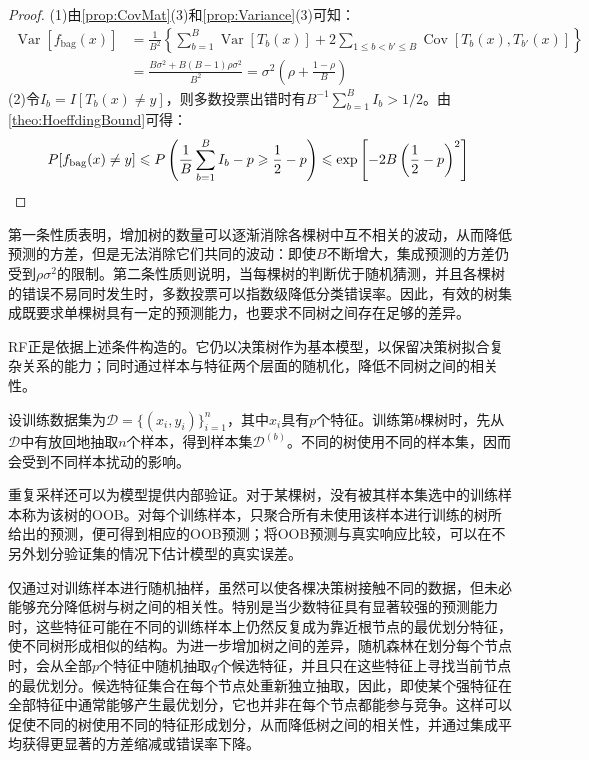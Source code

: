\begin{proof}
	(1)由\cref{prop:CovMat}(3)和\cref{prop:Variance}(3)可知：
	\begin{align*}
		\operatorname{Var}[f_{\mathrm{bag}}(x)]
		&=\frac{1}{B^2}\left\{\sum_{b=1}^{B}\operatorname{Var}[T_b(x)]+2\sum_{1\leqslant b<b'\leqslant B}\operatorname{Cov}[T_b(x),T_{b'}(x)]\right\} \\
		&=\frac{B\sigma^2+B(B-1)\rho\sigma^2}{B^2}
		=\sigma^2\left(\rho+\frac{1-\rho}{B}\right)
	\end{align*}
	(2)令$I_b=I[T_b(x)\ne y]$，则多数投票出错时有$B^{-1}\sum\limits_{b=1}^{B}I_b>1/2$。由\cref{theo:HoeffdingBound}可得：
	\begin{equation*}
		P[f_{\mathrm{bag}}(x)\ne y]
		\leqslant P\left(\frac{1}{B}\sum_{b=1}^{B}I_b-p\geqslant\frac{1}{2}-p\right)
		\leqslant\exp\left[-2B\left(\frac{1}{2}-p\right)^2\right]\qedhere
	\end{equation*}
\end{proof}
第一条性质表明，增加树的数量可以逐渐消除各棵树中互不相关的波动，从而降低预测的方差，但是无法消除它们共同的波动：即使$B$不断增大，集成预测的方差仍受到$\rho\sigma^2$的限制。第二条性质则说明，当每棵树的判断优于随机猜测，并且各棵树的错误不易同时发生时，多数投票可以指数级降低分类错误率。因此，有效的树集成既要求单棵树具有一定的预测能力，也要求不同树之间存在足够的差异。\par
\gls{RF}正是依据上述条件构造的。它仍以决策树作为基本模型，以保留决策树拟合复杂关系的能力；同时通过样本与特征两个层面的随机化，降低不同树之间的相关性。\par
设训练数据集为$\mathcal{D}=\{(x_i,y_i)\}_{i=1}^{n}$，其中$x_i$具有$p$个特征。训练第$b$棵树时，先从$\mathcal{D}$中有放回地抽取$n$个样本，得到样本集$\mathcal{D}^{(b)}$。不同的树使用不同的样本集，因而会受到不同样本扰动的影响。
\begin{note}
	重复采样还可以为模型提供内部验证。对于某棵树，没有被其样本集选中的训练样本称为该树的\gls{OOB}。对每个训练样本，只聚合所有未使用该样本进行训练的树所给出的预测，便可得到相应的OOB预测；将OOB预测与真实响应比较，可以在不另外划分验证集的情况下估计模型的真实误差。
\end{note}
仅通过对训练样本进行随机抽样，虽然可以使各棵决策树接触不同的数据，但未必能够充分降低树与树之间的相关性。特别是当少数特征具有显著较强的预测能力时，这些特征可能在不同的训练样本上仍然反复成为靠近根节点的最优划分特征，使不同树形成相似的结构。为进一步增加树之间的差异，随机森林在划分每个节点时，会从全部$p$个特征中随机抽取$q$个候选特征，并且只在这些特征上寻找当前节点的最优划分。候选特征集合在每个节点处重新独立抽取，因此，即使某个强特征在全部特征中通常能够产生最优划分，它也并非在每个节点都能参与竞争。这样可以促使不同的树使用不同的特征形成划分，从而降低树之间的相关性，并通过集成平均获得更显著的方差缩减或错误率下降。
